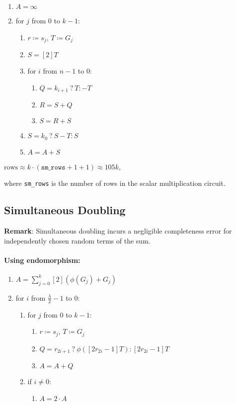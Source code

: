 \begin{enumerate}
	\item $A = \infty$
	\item for $j$ from $0$ to $k-1$:
	\begin{enumerate}
		\item $r \coloneqq s_j$, $T \coloneqq G_j$
		\item $S = [2]T$
		\item for $i$ from $n - 1$ to $0$:
		\begin{enumerate}
			\item $Q = k_{i + 1} \: ? \: T : -T$
			\item $R = S + Q$
			\item $S = R + S$
		\end{enumerate}
		\item $S = k_0 \: ? \: S - T : S$
		\item $A = A + S$
	\end{enumerate}
\end{enumerate}


\begin{center}
	$\text{rows} \approx k \cdot (\texttt{sm\_rows} + 1 + 1) \approx 105k$,
\end{center}
where \texttt{sm\_rows} is the number of rows in the scalar multiplication circuit. 

\subsection{Simultaneous Doubling}

\textbf{Remark}:
Simultaneous doubling incurs a negligible completeness error for independently chosen random terms of the sum.

\paragraph{Using endomorphism:} 

\begin{enumerate}
	\item $A = \sum\limits_{j = 0}^{k} [2](\phi(G_j) + G_j)$
	\item for $i$ from $\frac{\lambda}{2} - 1$ to $0$:
	\begin{enumerate}
		\item for $j$ from $0$ to $k-1$:
		\begin{enumerate}
			\item $r \coloneqq s_j$, $T \coloneqq G_j$
			\item $Q = r_{2i + 1} \: ? \: \phi([2r_{2i} - 1]T) : [2r_{2i} - 1]T$
			\item $A = A + Q$
		\end{enumerate}
		\item if $i \neq 0$:
		\begin{enumerate}
			\item $A = 2 \cdot A$
		\end{enumerate}
	\end{enumerate}
\end{enumerate}

